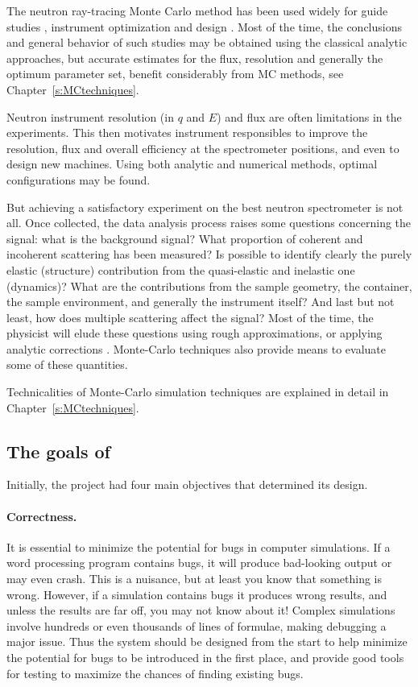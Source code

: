 The neutron ray-tracing Monte Carlo method has been used widely for
guide studies \cite{Copley93,Farhi02,Schanzer04}, instrument
optimization and design \cite{Zsigmond04,Lieutenant05}. Most of the
time, the conclusions and general behavior of such studies may be
obtained using the classical analytic approaches, but accurate
estimates for the flux, resolution and generally the optimum parameter
set, benefit considerably from MC methods, see Chapter~\ref{s:MCtechniques}.

Neutron instrument resolution (in $q$ and $E$) and flux are often limitations in the
experiments. This then motivates instrument responsibles to improve
the resolution, flux and overall efficiency at the spectrometer positions, and
even to design new machines. Using both analytic and numerical
methods, optimal configurations may be found.

But achieving a satisfactory experiment on the best neutron
spectrometer is not all. Once collected, the data analysis process
raises some questions concerning the signal: what is the background
signal? What proportion of coherent and incoherent scattering has
been measured? Is possible to identify clearly the purely elastic
(structure) contribution from the quasi-elastic and inelastic one
(dynamics)? What are the contributions from the sample geometry, the
container, the sample environment, and generally the instrument
itself? And last but not least, how does multiple scattering affect the
signal? Most of the time, the physicist will elude these questions
using rough approximations, or applying analytic corrections
\cite{Copley86}. Monte-Carlo techniques also provide means to evaluate
some of these quantities.

Technicalities of Monte-Carlo simulation
techniques are explained in detail in Chapter~\ref{s:MCtechniques}.

\subsection{The goals of \MCS}
\label{s:goals}

Initially, the \MCS project had four main objectives
that determined its design.

\paragraph{Correctness.}
It is essential to minimize the potential for bugs in computer
simulations.  If a word processing program contains bugs, it will
produce bad-looking output or may even crash. This is a nuisance, but at
least you know that something is wrong. However, if a simulation
contains bugs it produces wrong results, and unless the results are far
off, you may not know about it! Complex simulations involve hundreds or
even thousands of lines of formulae, making debugging a major issue. Thus the
system should be designed from the start to help minimize the potential
for bugs to be introduced in the first place, and provide good tools for
testing to maximize the chances of finding existing bugs.
%
